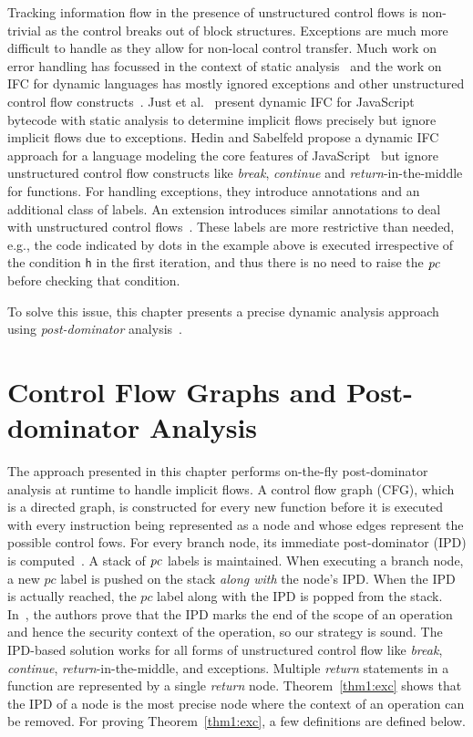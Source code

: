 Tracking information flow in the presence of unstructured control
flows is non-trivial as the control breaks out of block
structures. Exceptions are much more difficult to handle as they 
allow for non-local control transfer. Much work on error handling has
focussed in the context of static analysis~\cite{myersJFlow,aslan_plas09}
and the work on IFC for dynamic languages has mostly ignored
exceptions and other unstructured control flow 
constructs~\cite{plas09,plas10,stagedIFC,guarnieri11ISSTA,acsac09}.
Just et al.~\cite{just11PLASTIC} present dynamic IFC for JavaScript
bytecode with static analysis to determine implicit flows precisely
but ignore implicit flows due to exceptions. Hedin and Sabelfeld
propose a dynamic IFC approach for a language 
modeling the core features of JavaScript~\cite{csf12} but ignore
unstructured control flow constructs like \emph{break},
\emph{continue} and \emph{return}-in-the-middle for functions. For
handling exceptions, they introduce annotations and an additional
class of labels. An extension introduces similar annotations to deal
with unstructured control flows~\cite{sac14}. These labels are more
restrictive than needed, e.g., the code indicated by dots in the
example above is executed irrespective of the condition \texttt{h} in
the first iteration, and thus there is no need to raise the $\mathit{pc}$
before checking that condition. 

To solve this issue, this chapter presents a precise dynamic
analysis approach using \emph{post-dominator}
analysis~\cite{denning82,just11PLASTIC}.  

\section{Control Flow Graphs and Post-dominator Analysis}
The approach presented in this chapter performs on-the-fly
post-dominator analysis at runtime to handle implicit
flows. A control flow graph (CFG), which is a directed graph, is
constructed for every new function before it is executed with every
instruction being represented as a node and whose edges represent the
possible control fows. For every branch node, its immediate
post-dominator (IPD) is
computed~\cite{denning82,just11PLASTIC,post14}. A stack of $\mathit{pc}$  
labels is maintained. When executing a branch node, a new $pc$ label
is pushed on the stack \emph{along with} the node's IPD. When the IPD
is actually reached, the $pc$ label along with the IPD is popped from
the stack. In~\cite{Xin,Masri}, the authors prove that the IPD marks the
end of the scope of an operation and hence the security context of the
operation, so our strategy is sound. The IPD-based solution works for all
forms of unstructured control flow like \emph{break}, \emph{continue},
\emph{return}-in-the-middle, and exceptions. Multiple \emph{return}
statements in a function are represented by a single \emph{return} 
node. Theorem~\ref{thm1:exc} shows that the IPD of a node is the most
precise node where the context of an operation can be removed. For
proving Theorem~\ref{thm1:exc}, a few definitions are defined below.

